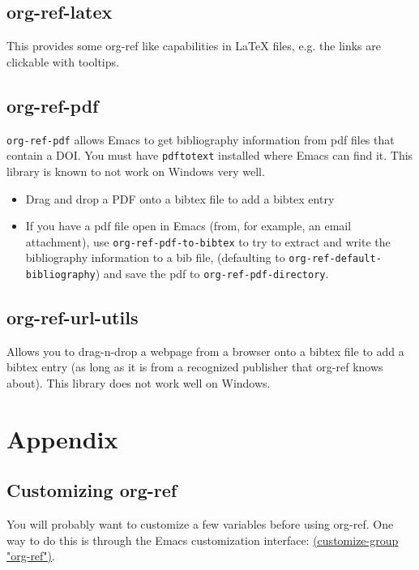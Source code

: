 \documentclass[11pt]{article}
\begin{document}
\subsection{org-ref-latex}
\label{sec:org0242342}

This provides some org-ref like capabilities in \LaTeX{} files, e.g. the links are clickable with tooltips.

\subsection{org-ref-pdf}
\label{sec:org7e7bed5}

\texttt{org-ref-pdf} allows Emacs to get bibliography information from pdf files that contain a DOI. You must have \texttt{pdftotext} installed where Emacs can find it. This library is known to not work on Windows very well.

\begin{itemize}
\item Drag and drop a PDF onto a bibtex file to add a bibtex entry
\item If you have a pdf file open in Emacs (from, for example, an email attachment), use \texttt{org-ref-pdf-to-bibtex} to try to extract and write the bibliography information to a bib file, (defaulting to \texttt{org-ref-default-bibliography}) and save the pdf to \texttt{org-ref-pdf-directory}.
\end{itemize}

\subsection{org-ref-url-utils}
\label{sec:org3ffcedb}

Allows you to drag-n-drop a webpage from a browser onto a bibtex file to add a bibtex entry (as long as it is from a recognized publisher that org-ref knows about). This library does not work well on Windows.

\section{Appendix}
\label{sec:org634a591}
\subsection{Customizing org-ref}
\label{sec:org69126c1}

You will probably want to customize a few variables before using org-ref. One way to do this is through the Emacs customization interface: \url{(customize-group "org-ref")}.
\end{document}
